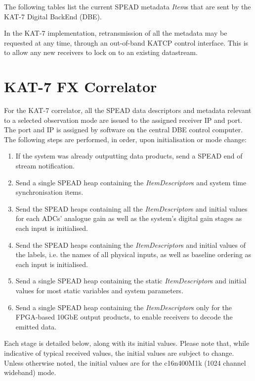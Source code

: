 \documentclass[11pt,english,twoside]{article}
\begin{document}
The following tables list the current SPEAD metadata \emph{Item}s that are sent by the KAT-7 Digital BackEnd (DBE). %

In the KAT-7 implementation, retransmission of all the metadata may be requested at any time, through an out-of-band KATCP control interface.
This is to allow any new receivers to lock on to an existing datastream.



\section{KAT-7 FX Correlator}\label{correlator}

For the KAT-7 correlator, all the SPEAD data descriptors and metadata relevant to a selected observation mode are issued to the assigned
receiver IP and port. The port and IP is assigned by software on the central DBE control computer.
The following steps are performed, in order, upon initialisation or mode change:

\begin{enumerate}
\item If the system was already outputting data products, send a SPEAD end of stream notification.
\item Send a single SPEAD heap containing the \emph{ItemDescriptor}s and system time synchronisation items.
\item Send the SPEAD heaps containing all the \emph{ItemDescriptor}s and initial values for each ADCs' analogue gain as well as the system's digital gain stages as each input is initialised.
\item Send the SPEAD heaps containing the \emph{ItemDescriptor}s and initial values of the labels, i.e. the names of all physical inputs, as well as baseline ordering as each input is initialised.
\item Send a single SPEAD heap containing the static \emph{ItemDescriptor}s and initial values for most static variables and system parameters.
\item Send a single SPEAD heap containing the \emph{ItemDescriptor}s only for the FPGA-based 10GbE output products, to enable receivers to decode the emitted data.
\end{enumerate}

Each stage is detailed below, along with its initial values. Please note that, while indicative of typical received values, the initial values
are subject to change. Unless otherwise noted, the initial values are for the c16n400M1k (1024 channel wideband) mode.
\end{document}
